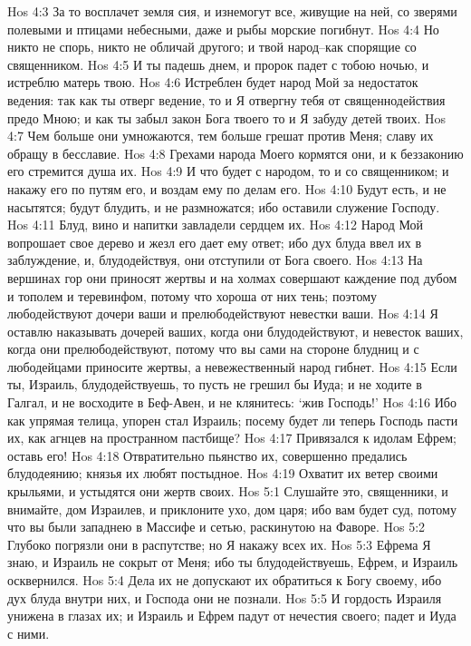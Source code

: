 Hos 4:3  За то восплачет земля сия, и изнемогут все, живущие на ней, со зверями полевыми и птицами небесными, даже и рыбы морские погибнут.
Hos 4:4  Но никто не спорь, никто не обличай другого; и твой народ--как спорящие со священником.
Hos 4:5  И ты падешь днем, и пророк падет с тобою ночью, и истреблю матерь твою.
Hos 4:6  Истреблен будет народ Мой за недостаток ведения: так как ты отверг ведение, то и Я отвергну тебя от священнодействия предо Мною; и как ты забыл закон Бога твоего то и Я забуду детей твоих.
Hos 4:7  Чем больше они умножаются, тем больше грешат против Меня; славу их обращу в бесславие.
Hos 4:8  Грехами народа Моего кормятся они, и к беззаконию его стремится душа их.
Hos 4:9  И что будет с народом, то и со священником; и накажу его по путям его, и воздам ему по делам его.
Hos 4:10  Будут есть, и не насытятся; будут блудить, и не размножатся; ибо оставили служение Господу.
Hos 4:11  Блуд, вино и напитки завладели сердцем их.
Hos 4:12  Народ Мой вопрошает свое дерево и жезл его дает ему ответ; ибо дух блуда ввел их в заблуждение, и, блудодействуя, они отступили от Бога своего.
Hos 4:13  На вершинах гор они приносят жертвы и на холмах совершают каждение под дубом и тополем и теревинфом, потому что хороша от них тень; поэтому любодействуют дочери ваши и прелюбодействуют невестки ваши.
Hos 4:14  Я оставлю наказывать дочерей ваших, когда они блудодействуют, и невесток ваших, когда они прелюбодействуют, потому что вы сами на стороне блудниц и с любодейцами приносите жертвы, а невежественный народ гибнет.
Hos 4:15  Если ты, Израиль, блудодействуешь, то пусть не грешил бы Иуда; и не ходите в Галгал, и не восходите в Беф-Авен, и не клянитесь: `жив Господь!'
Hos 4:16  Ибо как упрямая телица, упорен стал Израиль; посему будет ли теперь Господь пасти их, как агнцев на пространном пастбище?
Hos 4:17  Привязался к идолам Ефрем; оставь его!
Hos 4:18  Отвратительно пьянство их, совершенно предались блудодеянию; князья их любят постыдное.
Hos 4:19  Охватит их ветер своими крыльями, и устыдятся они жертв своих.
Hos 5:1  Слушайте это, священники, и внимайте, дом Израилев, и приклоните ухо, дом царя; ибо вам будет суд, потому что вы были западнею в Массифе и сетью, раскинутою на Фаворе.
Hos 5:2  Глубоко погрязли они в распутстве; но Я накажу всех их.
Hos 5:3  Ефрема Я знаю, и Израиль не сокрыт от Меня; ибо ты блудодействуешь, Ефрем, и Израиль осквернился.
Hos 5:4  Дела их не допускают их обратиться к Богу своему, ибо дух блуда внутри них, и Господа они не познали.
Hos 5:5  И гордость Израиля унижена в глазах их; и Израиль и Ефрем падут от нечестия своего; падет и Иуда с ними.
